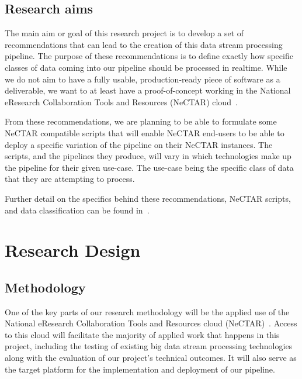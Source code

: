 \documentclass[a4paper,11pt]{article}
\begin{document}


\subsection{Research aims} %
\label{sub:research_aims}

The main aim or goal of this research project is to develop a set of recommendations that can lead to the creation of
this data stream processing pipeline. The purpose of these recommendations is to define exactly how specific classes of
data coming into our pipeline should be processed in realtime. While we do not aim to have a fully usable,
production-ready piece of software as a deliverable, we want to at least have a proof-of-concept working in the National
eResearch Collaboration Tools and Resources (NeCTAR) cloud~\cite{web:Nectar}.

From these recommendations, we are planning to be able to formulate some NeCTAR compatible scripts that will enable
NeCTAR end-users to be able to deploy a specific variation of the pipeline on their NeCTAR instances. The scripts, and
the pipelines they produce, will vary in which technologies make up the pipeline for their given use-case. The use-case
being the specific class of data that they are attempting to process.

Further detail on the specifics behind these recommendations, NeCTAR scripts, and data classification can be found
in~.





\section{Research Design} %
\label{sec:research_design}

\subsection{Methodology} %
\label{sub:methodology}

One of the key parts of our research methodology will be the applied use of the National eResearch Collaboration Tools
and Resources cloud (NeCTAR)~\cite{web:Nectar}. Access to this cloud will facilitate the majority of applied work that
happens in this project, including the testing of existing big data stream processing technologies along with the
evaluation of our project's technical outcomes. It will also serve as the target platform for the implementation and
deployment of our pipeline.
\end{document}
